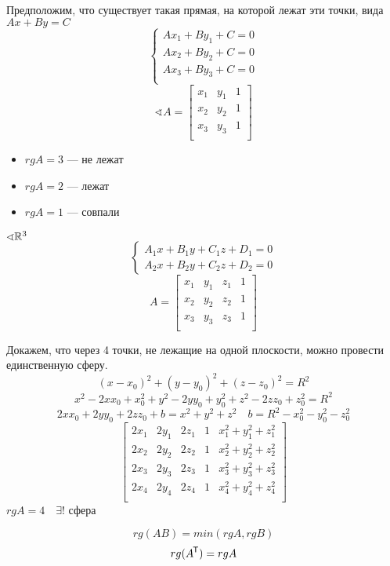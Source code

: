 Предположим, что существует такая прямая, на которой лежат эти точки, вида $Ax + By = C$
$$\begin{cases}
        Ax_1 + By_1 + C = 0 \\
        Ax_2 + By_2 + C = 0 \\
        Ax_3 + By_3 + C = 0 \\
    \end{cases}$$
$$\sphericalangle A = \begin{bmatrix}
        x_1 & y_1 & 1 \\
        x_2 & y_2 & 1 \\
        x_3 & y_3 & 1 \\
    \end{bmatrix}$$
\begin{itemize}
    \item $rg A = 3$ --- не лежат
    \item $rg A = 2$ --- лежат
    \item $rg A = 1$ --- совпали
\end{itemize}

$\sphericalangle \mathbb{R}^3$
$$\begin{cases}
        A_1x+B_1y+C_1z+D_1=0 \\
        A_2x+B_2y+C_2z+D_2=0
    \end{cases}$$
$$A=\begin{bmatrix}
        x_1 & y_1 & z_1 & 1 \\
        x_2 & y_2 & z_2 & 1 \\
        x_3 & y_3 & z_3 & 1 \\
    \end{bmatrix}$$

Докажем, что через 4 точки, не лежащие на одной плоскости, можно провести единственную сферу.
$$(x-x_0)^2+(y-y_0)^2+(z-z_0)^2=R^2$$
$$x^2-2xx_0+x_0^2 + y^2-2yy_0+y_0^2 + z^2-2zz_0+z_0^2 = R^2$$
$$2xx_0 + 2yy_0 + 2zz_0 + b = x^2 + y^2 + z^2 \quad b = R^2-x_0^2-y_0^2-z_0^2$$
$$\begin{bmatrix}
        2x_1 & 2y_1 & 2z_1 & 1 & x_1^2+y_1^2+z_1^2 \\
        2x_2 & 2y_2 & 2z_2 & 1 & x_2^2+y_2^2+z_2^2 \\
        2x_3 & 2y_3 & 2z_3 & 1 & x_3^2+y_3^2+z_3^2 \\
        2x_4 & 2y_4 & 2z_4 & 1 & x_4^2+y_4^2+z_4^2 \\
    \end{bmatrix}$$
$rg A = 4 \quad \exists!$ сфера

$$rg(AB) = min (rg A, rg B)$$
$$rg(A^{\mkern-1.5mu\mathsf{T}} )=rg A$$


